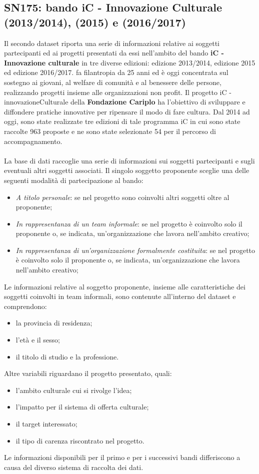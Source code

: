 \documentclass[a4paper,10pt]{scrartcl}
\begin{document}
\subsection{SN175: bando iC - Innovazione Culturale (2013/2014), (2015) e (2016/2017)}
Il secondo dataset riporta una serie di informazioni relative ai soggetti partecipanti ed ai progetti presentati da essi nell'ambito del bando \textbf{iC - Innovazione culturale} in tre diverse edizioni: edizione 2013/2014, edizione 2015 ed edizione 2016/2017.  fa filantropia da 25 anni ed è oggi concentrata sul sostegno ai giovani, al welfare di comunità e al benessere delle persone, realizzando progetti insieme alle organizzazioni non profit. Il progetto iC - innovazioneCulturale della \textbf{Fondazione Cariplo} ha l'obiettivo di sviluppare e diffondere pratiche innovative per ripensare il modo di fare cultura. Dal 2014 ad oggi, sono state realizzate tre edizioni di tale programma iC in cui sono state raccolte 963 proposte e ne sono state selezionate 54 per il percorso di accompagnamento.
\\ \\
La base di dati raccoglie una serie di informazioni sui soggetti partecipanti e sugli eventuali altri soggetti associati. Il singolo soggetto proponente sceglie una delle seguenti modalità di partecipazione al bando:
\begin{itemize}
\item\textit{A titolo personale}: se nel progetto sono coinvolti altri soggetti oltre al proponente;
\item\textit{In rappresentanza di un team informale}: se nel progetto è coinvolto solo il proponente o, se indicata, un’organizzazione che lavora nell’ambito creativo;
\item\textit{In rappresentanza di un’organizzazione formalmente costituita}: se nel progetto è coinvolto solo il proponente o, se indicata, un’organizzazione che lavora nell’ambito creativo;
\end{itemize}
Le informazioni relative al soggetto proponente, insieme alle caratteristiche dei soggetti coinvolti in team informali, sono contenute all'interno del dataset e comprendono:
\begin{itemize}
\item la provincia di residenza;
\item l'età e il sesso;
\item il titolo di studio e la professione.  
\end{itemize}
Altre variabili riguardano il progetto presentato, quali:
\begin{itemize}
\item l’ambito culturale cui si rivolge l’idea;
\item l’impatto per il sistema di offerta culturale;
\item il target interessato;
\item il tipo di carenza riscontrato nel progetto. 
\end{itemize}
Le informazioni disponibili per il primo e per i successivi bandi differiscono a causa del diverso sistema di raccolta dei dati.
\end{document}
